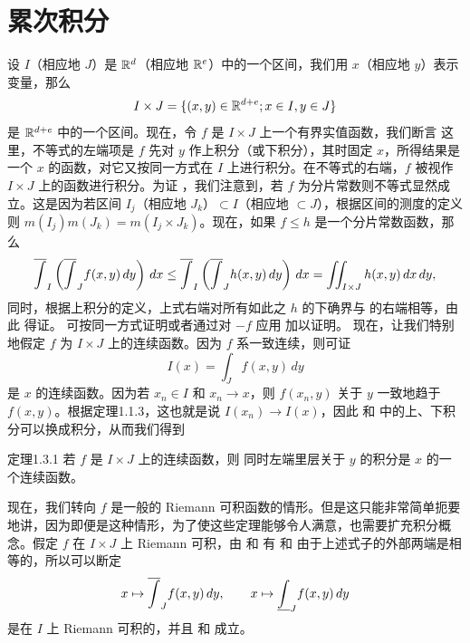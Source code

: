 \section{累次积分}
设 $I$（相应地 $J$）是 $\mathbb R^d$（相应地 $\mathbb R^e$）中的一个区间，我们用 $x$（相应地 $y$）表示变量，那么
\[I\times J=\{(x,y)\in\mathbb R^{d+e};x\in I,y\in J\}\]
是 $\mathbb R^{d+e}$ 中的一个区间。现在，令 $f$ 是 $I\times J$ 上一个有界实值函数，我们断言
这里，不等式的左端项是 $f$ 先对 $y$ 作上积分（或下积分），其时固定 $x$，所得结果是一个 $x$ 的函数，对它又按同一方式在 $I$ 上进行积分。在不等式的右端，$f$ 被视作 $I\times J$ 上的函数进行积分。为证 ，我们注意到，若 $f$ 为分片常数则不等式显然成立。这是因为若区间 $I_j$（相应地 $J_k$）$\subset I$（相应地 $\subset J$），根据区间的测度的定义则 $m(I_j)m(J_k)=m(I_j\times J_k)$。现在，如果 $f\le h$ 是一个分片常数函数，那么
\[\overline{\int}_I\left(\overline{\int}_J f(x,y)\,dy\right)\,dx\le\overline{\int}_I\left(\overline{\int}_J h(x,y)\,dy\right)\,dx=\iint_{I\times J}h(x,y)\,dx\,dy,\]
同时，根据上积分的定义，上式右端对所有如此之 $h$ 的下确界与  的右端相等，由此  得证。
 可按同一方式证明或者通过对 $-f$ 应用  加以证明。
现在，让我们特别地假定 $f$ 为 $I\times J$ 上的连续函数。因为 $f$ 系一致连续，则可证
\[I(x)=\int_J f(x,y)\,dy\]
是 $x$ 的连续函数。因为若 $x_n\in I$ 和 $x_n\to x$，则 $f(x_n,y)$ 关于 $y$ 一致地趋于 $f(x,y)$。根据定理1.1.3，这也就是说 $I(x_n)\to I(x)$，因此  和  中的上、下积分可以换成积分，从而我们得到
\begin{statement}{定理}{1.3.1}
若 $f$ 是 $I\times J$ 上的连续函数，则
同时左端里层关于 $y$ 的积分是 $x$ 的一个连续函数。
\end{statement}
现在，我们转向 $f$ 是一般的 Riemann 可积函数的情形。但是这只能非常简单扼要地讲，因为即便是这种情形，为了使这些定理能够令人满意，也需要扩充积分概念。假定 $f$ 在 $I\times J$ 上 Riemann 可积，由  和  有
和
由于上述式子的外部两端是相等的，所以可以断定
\[x\mapsto\overline{\int}_J f(x,y)\,dy,\qquad x\mapsto\underline{\int}_J f(x,y)\,dy\]
是在 $I$ 上 Riemann 可积的，并且
和
成立。

